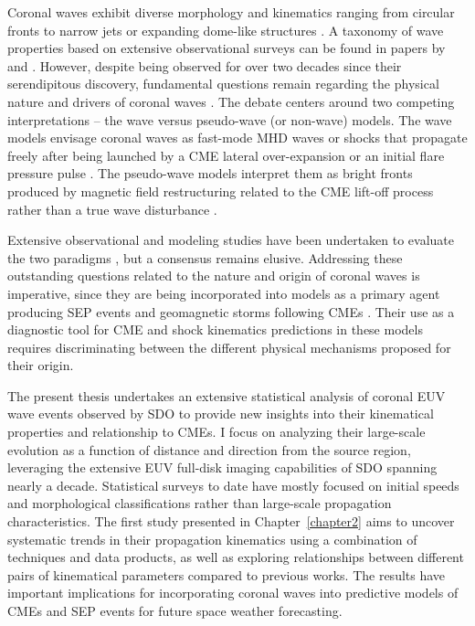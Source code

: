 Coronal waves exhibit diverse morphology and kinematics ranging from circular fronts to narrow jets or expanding dome-like structures \citep{veronig_2010}. A taxonomy of wave properties based on extensive observational surveys can be found in papers by \citet{muhr_2014} and \citet{nitta_2013}. However, despite being observed for over two decades since their serendipitous discovery, fundamental questions remain regarding the physical nature and drivers of coronal waves \citep{chen_2016, vrsnak_2008, warmuth_2015}. The debate centers around two competing interpretations -- the wave versus pseudo-wave (or non-wave) models. The wave models envisage coronal waves as fast-mode MHD waves or shocks that propagate freely after being launched by a CME lateral over-expansion or an initial flare pressure pulse \citep{wills_2007, vrsnak_2008}. The pseudo-wave models interpret them as bright fronts produced by magnetic field restructuring related to the CME lift-off process rather than a true wave disturbance \citep{delannee_1999, chen_2002}.

Extensive observational and modeling studies have been undertaken to evaluate the two paradigms \citep{patsourakos_2012, long_2017}, but a consensus remains elusive. Addressing these outstanding questions related to the nature and origin of coronal waves is imperative, since they are being incorporated into models as a primary agent producing SEP events and geomagnetic storms following CMEs \citep{rouillard_2012, park_2013}. Their use as a diagnostic tool for CME and shock kinematics predictions in these models requires discriminating between the different physical mechanisms proposed for their origin.

The present thesis undertakes an extensive statistical analysis of coronal EUV wave events observed by SDO to provide new insights into their kinematical properties and relationship to CMEs. I focus on analyzing their large-scale evolution as a function of distance and direction from the source region, leveraging the extensive EUV full-disk imaging capabilities of SDO spanning nearly a decade. Statistical surveys to date have mostly focused on initial speeds and morphological classifications rather than large-scale propagation characteristics. The first study presented in Chapter~\ref{chapter2} aims to uncover systematic trends in their propagation kinematics using a combination of techniques and data products, as well as exploring relationships between different pairs of kinematical parameters compared to previous works.
The results have important implications for incorporating coronal waves into predictive models of CMEs and SEP events for future space weather forecasting.

